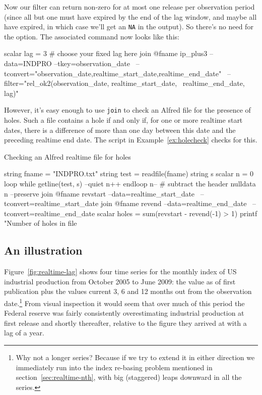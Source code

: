 Now our filter can return non-zero for at most one release per
observation period (since all but one must have expired by the end of
the lag window, and maybe all have expired, in which case we'll get an
\texttt{NA} in the output). So there's no need for the 
option. The associated command now looks like this:

\begin{code}
scalar lag = 3  # choose your fixed lag here
join @fname ip_plus3 --data=INDPRO --tkey=observation_date \
--tconvert="observation_date,realtime_start_date,realtime_end_date" \
--filter="rel_ok2(observation_date, realtime_start_date, \
 realtime_end_date, lag)"
\end{code}

However, it's easy enough to use \texttt{join} to check an Alfred file
for the presence of holes. Such a file contains a hole if and only if,
for one or more realtime start dates, there is a difference of more
than one day between this date and the preceding realtime end
date. The script in Example~\ref{ex:holecheck} checks for this.

\begin{script}[htbp]
  \caption{Checking an Alfred realtime file for holes}
  \label{ex:holecheck}
\begin{scode}
string fname = "INDPRO.txt"
string test = readfile(fname)
string s
scalar n = 0
loop while getline(test, s) --quiet
  n++
endloop
n-- # subtract the header
nulldata n --preserve
join @fname revstart --data=realtime_start_date \
 --tconvert=realtime_start_date
join @fname revend --data=realtime_end_date \
 --tconvert=realtime_end_date
scalar holes = sum(revstart - revend(-1) > 1)
printf "Number of holes in file %
\end{scode}
\end{script}

\subsection{An illustration}

Figure~\ref{fig:realtime-lag} shows four time series for the monthly
index of US industrial production from October 2005 to June 2009: the
value as of first publication plus the values current 3, 6 and 12
months out from the observation date.\footnote{Why not a longer
  series? Because if we try to extend it in either direction we
  immediately run into the index re-basing problem mentioned in
  section~\ref{sec:realtime-nth}, with big (staggered) leaps downward
  in all the series.} From visual inspection it would seem that over
much of this period the Federal reserve was fairly consistently
overestimating industrial production at first release and shortly
thereafter, relative to the figure they arrived at with a lag of a
year.


